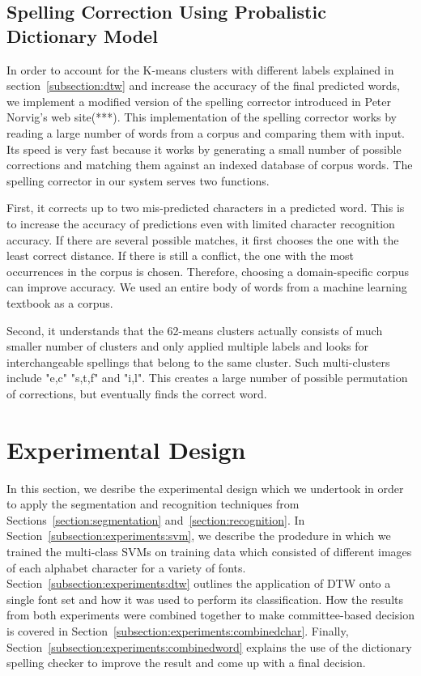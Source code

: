 \documentclass[12pt]{article}
\begin{document}
	\subsection{Spelling Correction Using Probalistic Dictionary Model}
	\label{subsection:spellingcheck}
	
	In order to account for the K-means clusters with different labels explained in section~\ref{subsection:dtw} and increase the accuracy of the final predicted words, we implement a modified version of the spelling corrector introduced in Peter Norvig's web site(***). This implementation of the spelling corrector works by reading a large number of words from a corpus and comparing them with input. Its speed is very fast because it works by generating a small number of possible corrections and matching them against an indexed database of corpus words. The spelling corrector in our system serves two functions.
	
	First, it corrects up to two mis-predicted characters in a predicted word. This is to increase the accuracy of predictions even with limited character recognition accuracy. If there are several possible matches, it first chooses the one with the least correct distance. If there is still a conflict, the one with the most occurrences in the corpus is chosen. Therefore, choosing a domain-specific corpus can improve accuracy. We used an entire body of words from a machine learning textbook as a corpus.
	
	Second, it understands that the 62-means clusters actually consists of much smaller number of clusters and only applied multiple labels and looks for interchangeable spellings that belong to the same cluster. Such multi-clusters include "e,c" "s,t,f" and "i,l". This creates a large number of possible permutation of corrections, but eventually finds the correct word.	
	
\section{Experimental Design}
\label{section:experiments}
In this section, we desribe the experimental design which we undertook in order to apply the segmentation and recognition techniques from Sections~\ref{section:segmentation} and~\ref{section:recognition}. In Section~\ref{subsection:experiments:svm}, we describe the prodedure in which we trained the multi-class SVMs on training data which consisted of different images of each alphabet character for a variety of fonts. Section~\ref{subsection:experiments:dtw} outlines the application of DTW onto a single font set and how it was used to perform its classification. How the results from both experiments were combined together to make committee-based decision is covered in Section~\ref{subsection:experiments:combinedchar}. Finally, Section~\ref{subsection:experiments:combinedword} explains the use of the dictionary spelling checker to improve the result and come up with a final decision.
	
\end{document}
